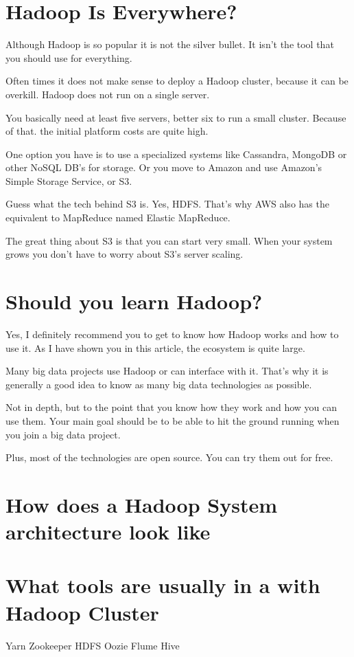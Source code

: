 \documentclass[12pt, numbers=noenddot]{scrreprt} %
\begin{document}
\section{Hadoop Is Everywhere?}

Although Hadoop is so popular it is not the silver bullet. It isn’t the tool that you should use for everything.

Often times it does not make sense to deploy a Hadoop cluster, because it can be overkill. Hadoop does not run on a single server.

You basically need at least five servers, better six to run a small cluster. Because of that. the initial platform costs are quite high.

One option you have is to use a specialized systems like Cassandra, MongoDB or other NoSQL DB’s for storage. Or you move to Amazon and use Amazon’s Simple Storage Service, or S3.

Guess what the tech behind S3 is. Yes, HDFS. That’s why AWS also has the equivalent to MapReduce named Elastic MapReduce.

The great thing about S3 is that you can start very small. When your system grows you don’t have to worry about S3’s server scaling.

\section{Should you learn Hadoop? }

Yes, I definitely recommend you to get to know how Hadoop works and how to use it. As I have shown you in this article, the ecosystem is quite large.

Many big data projects use Hadoop or can interface with it. That's why it is generally a good idea to know as many big data technologies as possible.

Not in depth, but to the point that you know how they work and how you can use them. Your main goal should be to be able to hit the ground running when you join a big data project.

Plus, most of the technologies are open source. You can try them out for free.
\section{How does a Hadoop System architecture look like}
\section{What tools are usually in a with Hadoop Cluster}
Yarn
Zookeeper
HDFS
Oozie
Flume
Hive
\end{document}
